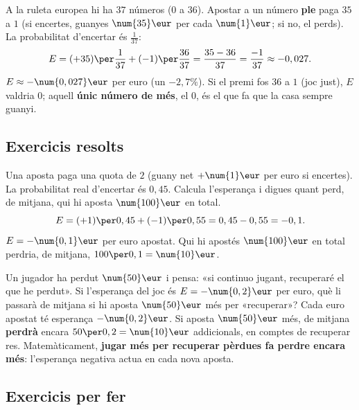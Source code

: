 \begin{exemple}
A la ruleta europea hi ha $37$ números ($0$ a $36$). Apostar a un número \textbf{ple}
paga $35$ a $1$ (si encertes, guanyes $\num{35}\eur$ per cada $\num{1}\eur$; si no, el
perds). La probabilitat d'encertar és $\frac{1}{37}$:
\[
E = (+35)\per\frac{1}{37} + (-1)\per\frac{36}{37}=\frac{35-36}{37}=\frac{-1}{37}\approx -0,027.
\]
$E\approx -\num{0,027}\eur$ per euro (un $-2,7\%$). Si el premi fos $36$ a $1$ (joc
just), $E$ valdria $0$; aquell \textbf{únic número de més}, el $0$, és el que fa que la
casa sempre guanyi.
\end{exemple}

\subsection{Exercicis resolts}

\begin{exresolt}
Una aposta paga una quota de $2$ (guany net $+\num{1}\eur$ per euro si encertes). La
probabilitat real d'encertar és $0,45$. Calcula l'esperança i digues quant perd, de
mitjana, qui hi aposta $\num{100}\eur$ en total.
\solucio
\[
E = (+1)\per 0,45 + (-1)\per 0,55 = 0,45 - 0,55 = -0,1.
\]
$E=-\num{0,1}\eur$ per euro apostat. Qui hi apostés $\num{100}\eur$ en total perdria, de
mitjana, $100\per 0,1 = \num{10}\eur$.
\end{exresolt}

\begin{exresolt}
Un jugador ha perdut $\num{50}\eur$ i pensa: «si continuo jugant, recuperaré el que he
perdut». Si l'esperança del joc és $E=-\num{0,2}\eur$ per euro, què li passarà de
mitjana si hi aposta $\num{50}\eur$ més per «recuperar»?
\solucio
Cada euro apostat té esperança $-\num{0,2}\eur$. Si aposta $\num{50}\eur$ més, de
mitjana \textbf{perdrà} encara $50\per 0,2 = \num{10}\eur$ addicionals, en comptes de
recuperar res. Matemàticament, \textbf{jugar més per recuperar pèrdues fa perdre
encara més}: l'esperança negativa actua en cada nova aposta.
\end{exresolt}

\subsection{Exercicis per fer}

